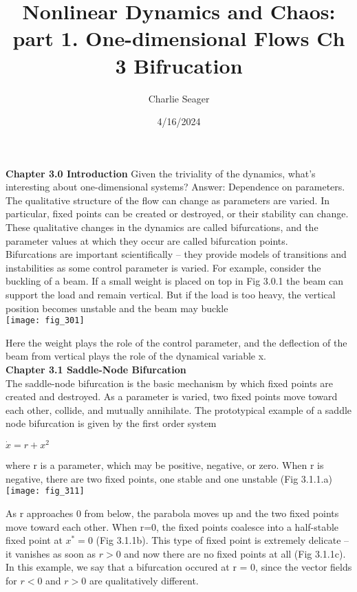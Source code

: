 \documentclass{article}
\newcommand\tab[1][1cm]{\hspace*{#1}}
\begin{document}
\title {Nonlinear Dynamics and Chaos: part 1. One-dimensional Flows Ch 3 Bifrucation}

\author{Charlie Seager}

\date{4/16/2024}

\maketitle

\textbf{Chapter 3.0 Introduction} Given the triviality of the dynamics, what's interesting about one-dimensional systems? Answer: Dependence on parameters. The qualitative structure of the flow can change as parameters are varied. In particular, fixed points can be created or destroyed, or their stability can change. These qualitative changes in the dynamics are called bifurcations, and the parameter values at which they occur are called bifurcation points. \\
Bifurcations are important scientifically -- they provide models of transitions and instabilities as some control parameter is varied. For example, consider the buckling of a beam. If a small weight is placed on top in Fig 3.0.1 the beam can support the load and remain vertical. But if the load is too heavy, the vertical position becomes unstable and the beam may buckle \\
\texttt{[image: fig\_301]}

Here the weight plays the role of the control parameter, and the deflection of the beam from vertical plays the role of the dynamical variable x. \\

\textbf {Chapter 3.1 Saddle-Node Bifurcation}
\\
The saddle-node bifurcation is the basic mechanism by which fixed points are created and destroyed. As a parameter is varied, two fixed points move toward each other, collide, and mutually annihilate.
\tab The prototypical example of a saddle node bifurcation is given by the first order system
\begin{center}
$\dot{x} = r + x^{2}$
\end{center}
where r is a parameter, which may be positive, negative, or zero. When r is negative, there are two fixed points, one stable and one unstable (Fig 3.1.1.a)
\texttt{[image: fig\_311]}

As r approaches 0 from below, the parabola moves up and the two fixed points move toward each other. When r=0, the fixed points coalesce into a half-stable fixed point at $x^{*} = 0$ (Fig 3.1.1b). This type of fixed point is extremely delicate -- it vanishes as soon as $r > 0$ and now there are no fixed points at all (Fig 3.1.1c). \\
\tab In this example, we say that a bifurcation occured at r = 0, since the vector fields for $r < 0$ and $r > 0$ are qualitatively different. \\
\end{document}
